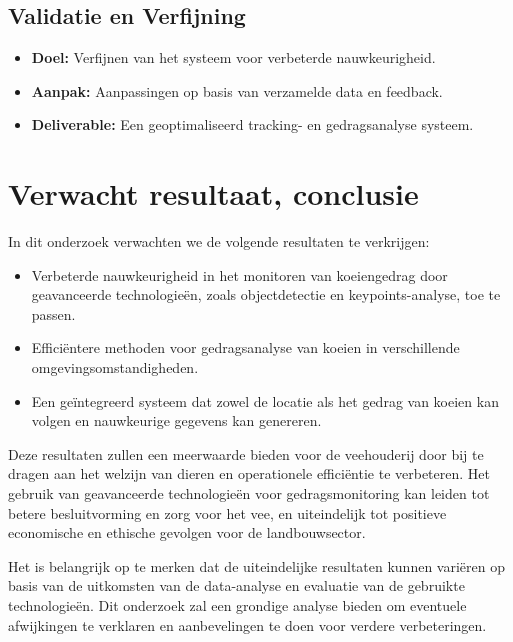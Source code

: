 \subsection{Validatie en Verfijning}
\begin{itemize}
  \item \textbf{Doel:} Verfijnen van het systeem voor verbeterde nauwkeurigheid.
  \item \textbf{Aanpak:} Aanpassingen op basis van verzamelde data en feedback.
  \item \textbf{Deliverable:} Een geoptimaliseerd tracking- en gedragsanalyse systeem.
\end{itemize}
\section{Verwacht resultaat, conclusie}%
\label{sec:verwachte_resultaten}

In dit onderzoek verwachten we de volgende resultaten te verkrijgen:
\begin{itemize}
  \item Verbeterde nauwkeurigheid in het monitoren van koeiengedrag door geavanceerde technologieën, zoals objectdetectie en keypoints-analyse, toe te passen.
  \item Efficiëntere methoden voor gedragsanalyse van koeien in verschillende omgevingsomstandigheden.
  \item Een geïntegreerd systeem dat zowel de locatie als het gedrag van koeien kan volgen en nauwkeurige gegevens kan genereren.
\end{itemize}
Deze resultaten zullen een meerwaarde bieden voor de veehouderij door bij te dragen aan het welzijn van dieren en operationele efficiëntie te verbeteren. Het gebruik van geavanceerde technologieën voor gedragsmonitoring kan leiden tot betere besluitvorming en zorg voor het vee, en uiteindelijk tot positieve economische en ethische gevolgen voor de landbouwsector.

Het is belangrijk op te merken dat de uiteindelijke resultaten kunnen variëren op basis van de uitkomsten van de data-analyse en evaluatie van de gebruikte technologieën. Dit onderzoek zal een grondige analyse bieden om eventuele afwijkingen te verklaren en aanbevelingen te doen voor verdere verbeteringen.
